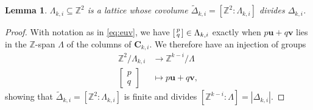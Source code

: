 \documentclass{article}
\numberwithin{equation}{section}
\newtheorem{lem}[thm]{Lemma}
\theoremstyle{definition}
\theoremstyle{remark}
\newcommand{\ZZ}{\mathbb{Z}}
\newcommand{\longto}{\mathop{\longrightarrow}\limits}
\newcommand{\<}{\left\langle}
\renewcommand{\>}{\right\rangle}
\begin{document}
\begin{lem} \label{lem:Delta_dvd}
  $\Lambda_{k,i} \subseteq \ZZ^2$ is a lattice whose covolume $\widetilde\Delta_{k,i} = [\ZZ^2 : \Lambda_{k,i}]$ divides $\Delta_{k,i}$.
\end{lem}
\begin{proof}
  With notation as in \eqref{eq:euv}, we have $\begin{bsmallmatrix}
    p \\ q
  \end{bsmallmatrix} \in \Lambda_{k,i}$ exactly when $p\mathbf{u} + q\mathbf{v}$ lies in the $\ZZ$-span $\Lambda$ of the columns of $\mathbf{C}_{k,i}$. We therefore have an injection of groups
  \begin{equation*}
    \begin{aligned}
      \ZZ^2 / \Lambda_{k,i} &\longto \ZZ^{k-i} / \Lambda \\
      \begin{bmatrix}
        p \\ q
      \end{bmatrix} & \longmapsto p\mathbf{u} + q\mathbf{v},
    \end{aligned}
  \end{equation*}
  showing that $\widetilde\Delta_{k,i} = [\ZZ^2 : \Lambda_{k,i}]$ is finite and divides $[\ZZ^{k-i} : \Lambda] = |\Delta_{k,i}|$.
\end{proof}
\end{document}
